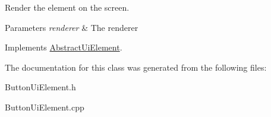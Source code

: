 Render the element on the screen. 


\begin{DoxyParams}{Parameters}
{\em renderer} & The renderer\\
\hline
\end{DoxyParams}


Implements \mbox{\hyperlink{class_abstract_ui_element_aea66ce333323cf2d5e12d4de9515de7b}{Abstract\+Ui\+Element}}.



The documentation for this class was generated from the following files\+:\begin{DoxyCompactItemize}
\item 
Button\+Ui\+Element.\+h\item 
Button\+Ui\+Element.\+cpp\end{DoxyCompactItemize}
